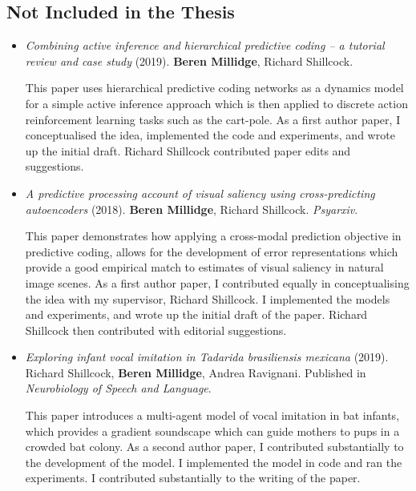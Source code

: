 \subsection{Not Included in the Thesis}
\begin{itemize}

\item \emph{Combining active inference and hierarchical predictive coding -- a tutorial review and case study} (2019). \textbf{Beren Millidge}, Richard Shillcock.

This paper uses hierarchical predictive coding networks as a dynamics model for a simple active inference approach which is then applied to discrete action reinforcement learning tasks such as the cart-pole. As a first author paper, I conceptualised the idea, implemented the code and experiments, and wrote up the initial draft. Richard Shillcock contributed paper edits and suggestions.

\item \emph{A predictive processing account of visual saliency using cross-predicting autoencoders} (2018). \textbf{Beren Millidge}, Richard Shillcock. \emph{Psyarxiv}.

This paper demonstrates how applying a cross-modal prediction objective in predictive coding, allows for the development of error representations which provide a good empirical match to estimates of visual saliency in natural image scenes. As a first author paper, I contributed equally in conceptualising the idea with my supervisor, Richard Shillcock. I implemented the models and experiments, and wrote up the initial draft of the paper. Richard Shillcock then contributed with editorial suggestions.

\item  \emph{Exploring infant vocal imitation in Tadarida brasiliensis mexicana} (2019). Richard Shillcock, \textbf{Beren Millidge}, Andrea Ravignani. Published in \emph{Neurobiology of Speech and Language}.

This paper introduces a multi-agent model of vocal imitation in bat infants, which provides a gradient soundscape which can guide mothers to pups in a crowded bat colony. As a second author paper, I contributed substantially to the development of the model. I implemented the model in code and ran the experiments. I contributed substantially to the writing of the paper.



\end{itemize}
